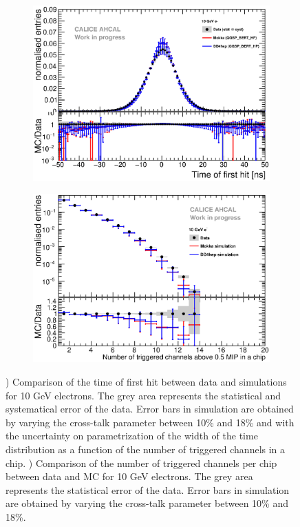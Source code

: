 \begin{figure}[htbp!]
	\centering
	\begin{subfigure}[t]{0.49\textwidth}
		\includegraphics[width=1\textwidth]{../Thesis_Plots/Timing/Electrons/Plots/Comparison_SimData_Electrons10GeV.eps}
		\caption{}\label{fig:elec_sim_data_10GeV}
	\end{subfigure}
	\hfill
	\begin{subfigure}[t]{0.49\textwidth}
		\includegraphics[width=1\textwidth]{../Thesis_Plots/Timing/Electrons/Plots/Comparison_SimData_Electrons_nHits_10GeV.eps}
		\caption{}\label{fig:elec_sim_data_nHits_10GeV}
	\end{subfigure}
	\caption{) Comparison of the time of first hit between data and simulations for 10 GeV electrons. The grey area represents the statistical and systematical error of the data. Error bars in simulation are obtained by varying the cross-talk parameter between 10\% and 18\% and with the uncertainty on parametrization of the width of the time distribution as a function of the number of triggered channels in a chip. ) Comparison of the number of triggered channels per chip between data and MC for 10 GeV electrons. The grey area represents the statistical error of the data. Error bars in simulation are obtained by varying the cross-talk parameter between 10\% and 18\%.}
\end{figure}

